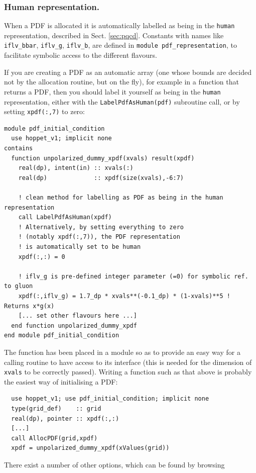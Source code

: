 \documentclass[12pt]{article}
\newcommand{\ttt}[1]{\texttt{#1}}
\begin{document}
\subsubsection{Human representation.}
\label{sec:human-rep}
When a PDF is allocated it is automatically labelled as being in the
\ttt{human} representation, described in
Sect. \ref{sec:pqcd}. Constants with names like
\ttt{iflv\_bbar}, \ttt{iflv\_g}, \ttt{iflv\_b}, are defined in
\ttt{module pdf\_representation}, to facilitate symbolic access to the
different flavours.

If you are creating a PDF as an automatic array (one whose bounds are
decided not by the allocation routine, but on the fly), for example in
a function that returns a PDF, then you should label it yourself as
being in the \ttt{human} representation, either with the
\ttt{LabelPdfAsHuman(pdf)} subroutine call, or by setting
\ttt{xpdf(:,7)} to zero:
\begin{lstlisting}
module pdf_initial_condition
  use hoppet_v1; implicit none
contains
  function unpolarized_dummy_xpdf(xvals) result(xpdf)
    real(dp), intent(in) :: xvals(:)
    real(dp)             :: xpdf(size(xvals),-6:7)

    ! clean method for labelling as PDF as being in the human representation
    call LabelPdfAsHuman(xpdf)
    ! Alternatively, by setting everything to zero 
    ! (notably xpdf(:,7)), the PDF representation
    ! is automatically set to be human
    xpdf(:,:) = 0
    
    ! iflv_g is pre-defined integer parameter (=0) for symbolic ref. to gluon
    xpdf(:,iflv_g) = 1.7_dp * xvals**(-0.1_dp) * (1-xvals)**5 ! Returns x*g(x)
    [... set other flavours here ...]
  end function unpolarized_dummy_xpdf
end module pdf_initial_condition
\end{lstlisting}
The function has been placed in a module so as to provide an easy way
for a calling routine to have access to its interface (this is needed
for the dimension of \ttt{xvals} to be correctly passed).  Writing a
function such as that above is probably the easiest way of
initialising a PDF:
\begin{lstlisting}
  use hoppet_v1; use pdf_initial_condition; implicit none
  type(grid_def)    :: grid
  real(dp), pointer :: xpdf(:,:)
  [...]
  call AllocPDF(grid,xpdf)
  xpdf = unpolarized_dummy_xpdf(xValues(grid))
\end{lstlisting}
There exist a number of other options, which can be found by browsing
\end{document}
